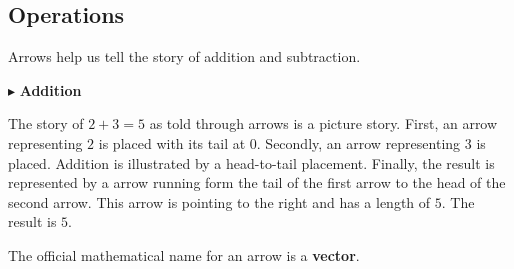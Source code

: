 \documentclass{ximera}
\begin{document}
\subsection{Operations} 


Arrows help us tell the story of addition and subtraction.



$\blacktriangleright$ \textbf{Addition}


The story of $2+3=5$ as told through arrows is a picture story.  First, an arrow representing $2$ is placed with its tail at $0$.  Secondly, an arrow representing $3$ is placed.  Addition is illustrated by a head-to-tail placement.  Finally, the result is represented by a arrow running form the tail of the first arrow to the head of the second arrow. This arrow is pointing to the right and has a length of $5$.  The result is $5$.




  \begin{image}
  \end{image}





The official mathematical name for an arrow is a \textbf{\textcolor{purple!85!blue}{vector}}.
\end{document}
